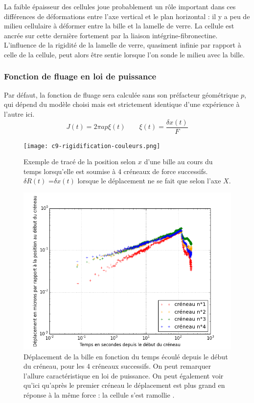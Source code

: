 La faible épaisseur des cellules joue probablement un rôle important dans ces différences de déformations entre l'axe vertical et le plan horizontal : il y a peu de milieu cellulaire à déformer entre la bille et la lamelle de verre. La cellule est ancrée sur cette dernière fortement par la liaison intégrine-fibronectine. L'influence de la rigidité de la lamelle de verre, quasiment infinie par rapport à celle de la cellule, peut alors être sentie lorsque l'on sonde le milieu avec la bille. 



\subsubsection{Fonction de fluage en loi de puissance}

Par défaut, la fonction de fluage sera calculée sans son préfacteur géométrique $p$, qui dépend du modèle choisi mais est strictement identique d'une expérience à l'autre ici.
$$ J(t) = 2 \pi a p \xi (t)\qquad \xi (t) = \frac{\delta x (t)}{F}$$
	
\begin{figure}
\texttt{[image: c9-rigidification-couleurs.png]}

\caption{Exemple de tracé de la position selon $x$ d'une bille au cours du temps lorsqu'elle est soumise à 4 créneaux de force successifs. $\delta R(t)$ =$\delta x(t)$ lorsque le déplacement ne se fait que selon l'axe $X$.\label{Exemple}} 
	\includegraphics[scale=0.5]{Figures/Exemple_C162_loglog.png}
	\caption{Déplacement de la bille en fonction du temps écoulé depuis le début du créneau, pour les 4 créneaux successifs. On peut remarquer l'allure caractéristique en loi de puissance. On peut également voir qu'ici qu'après le premier créneau le déplacement est plus grand en réponse à la même force : la cellule s'est \og ramollie \fg. }
\end{figure}


